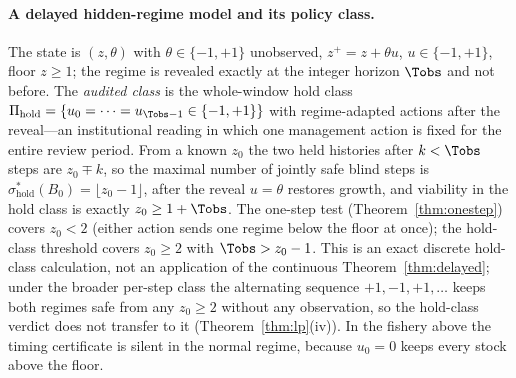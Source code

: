 \paragraph{A delayed hidden-regime model and its policy class.} The state is $(z,\theta)$ with $\theta\in\{-1,+1\}$ unobserved, $z^+=z+\theta u$, $u\in\{-1,+1\}$, floor $z\ge1$; the regime is revealed exactly at the integer horizon $\Tobs$ and not before. The \emph{audited class} is the whole-window hold class $\Pi_{\mathrm{hold}}=\{u_0=\dots=u_{\Tobs-1}\in\{-1,+1\}\}$ with regime-adapted actions after the reveal---an institutional reading in which one management action is fixed for the entire review period. From a known $z_0$ the two held histories after $k<\Tobs$ steps are $z_0\mp k$, so the maximal number of jointly safe blind steps is $\sigma^*_{\mathrm{hold}}(B_0)=\lfloor z_0-1\rfloor$, after the reveal $u=\theta$ restores growth, and viability in the hold class is exactly $z_0\ge1+\Tobs$. The one-step test (Theorem~\ref{thm:onestep}) covers $z_0<2$ (either action sends one regime below the floor at once); the hold-class threshold covers $z_0\ge2$ with $\Tobs>z_0-1$. This is an exact discrete hold-class calculation, not an application of the continuous Theorem~\ref{thm:delayed}; under the broader per-step class the alternating sequence $+1,-1,+1,\dots$ keeps both regimes safe from any $z_0\ge2$ without any observation, so the hold-class verdict does not transfer to it (Theorem~\ref{thm:lp}(iv)). In the fishery above the timing certificate is silent in the normal regime, because $u_0=0$ keeps every stock above the floor.

